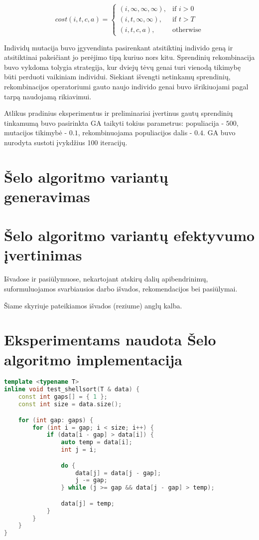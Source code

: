\documentclass{VUMIFInfBakalaurinis}
\begin{document}
\[
  cost(i, t, c, a)=
  \begin{cases}
    (i, \infty, \infty, \infty),& \text{if } i > 0\\
    (i, t, \infty, \infty),& \text{if } t > T\\
    (i, t, c, a), & \text{otherwise}
  \end{cases}
\]


Individų mutacija buvo įgyvendinta pasirenkant atsitiktinį individo geną ir atsitiktinai pakeičiant jo perėjimo tipą kuriuo nors kitu.
Sprendinių rekombinacija buvo vykdoma tolygia strategija, kur dviejų tėvų genai turi vienodą tikimybę
būti perduoti vaikiniam individui.
Siekiant išvengti netinkamų sprendinių, rekombinacijos operatoriumi gauto naujo individo genai buvo išrikiuojami pagal tarpą naudojamą rikiavimui.

Atlikus pradinius eksperimentus ir preliminariai įvertinus gautų sprendinių tinkamumą buvo pasirinkta GA taikyti tokius parametrus:
populiacija - $500$, mutacijos tikimybė - $0.1$, rekombinuojama populiacijos dalis - $0.4$.
GA buvo nurodyta sustoti įvykdžius 100 iteracijų.

\section{Šelo algoritmo variantų generavimas}

\section{Šelo algoritmo variantų efektyvumo įvertinimas}

Išvadose ir pasiūlymuose, nekartojant atskirų dalių apibendrinimų,
suformuluojamos svarbiausios darbo išvados, rekomendacijos bei pasiūlymai.

Šiame skyriuje pateikiamos išvados (reziume) anglų kalba.


\printbibliography[heading=bibintoc]

\appendix  %

\section{Eksperimentams naudota Šelo algoritmo implementacija}

\begin{lstlisting}[label={alg:test_shellsort},language=C++]
template <typename T>
inline void test_shellsort(T & data) {
    const int gaps[] = { 1 };
    const int size = data.size();

    for (int gap: gaps) {
        for (int i = gap; i < size; i++) {
            if (data[i - gap] > data[i]) {
                auto temp = data[i];
                int j = i;

                do {
                    data[j] = data[j - gap];
                    j -= gap;
                } while (j >= gap && data[j - gap] > temp);

                data[j] = temp;
            }
        }
    }
}
\end{lstlisting}
\end{document}
